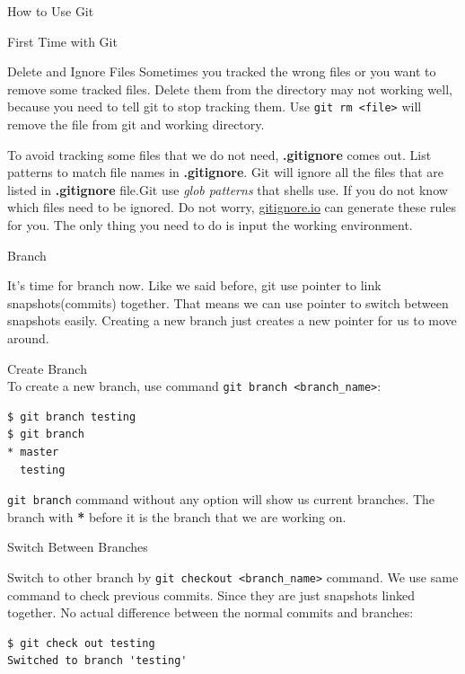 \documentclass[12pt, a4papaer]{article}
\begin{document}
\begin{section}{How to Use Git}
\begin{subsection}{First Time with Git}
\begin{subsubsection}{Delete and Ignore Files}
Sometimes you tracked the wrong files or you want to remove some tracked files.
Delete them from the directory may not working well, because you need to tell
git to stop tracking them. Use \verb|git rm <file>| will remove the file from git
and working directory.

To avoid tracking some files that we do not need, \textbf{.gitignore} comes out.
List patterns to match file names in \textbf{.gitignore}. Git will ignore all
the files that are listed in \textbf{.gitignore} file.Git use \textit{glob patterns}
that shells use. If you do not know which files need to be ignored. Do not worry,
\href{https://www.gitignore.io/}{\underline{gitignore.io}} can generate these
rules for you. The only thing you need to do is input the working environment.
\end{subsubsection}
\end{subsection}

\begin{subsection}{Branch}
    
It's time for branch now. Like we said before, git use pointer to link snapshots(commits)
together. That means we can use pointer to switch between snapshots easily. Creating
a new branch just creates a new pointer for us to move around.

\begin{paragraph}{Create Branch\\}
To create a new branch, use command \verb|git branch <branch_name>|:

\begin{lstlisting}
$ git branch testing
$ git branch
* master
  testing
\end{lstlisting}

\verb|git branch| command without any option will show us current branches.
The branch with \textbf{*} before it is the branch that we are working on.

\end{paragraph}

\begin{paragraph}{Switch Between Branches\\}

Switch to other branch by \verb|git checkout <branch_name>| command. We 
use same command to check previous commits. Since they are just snapshots linked
together. No actual difference between the normal commits and branches:

\begin{lstlisting}
$ git check out testing
Switched to branch 'testing'
\end{lstlisting}


\end{paragraph}
\end{subsection}
\end{section}
\end{document}
